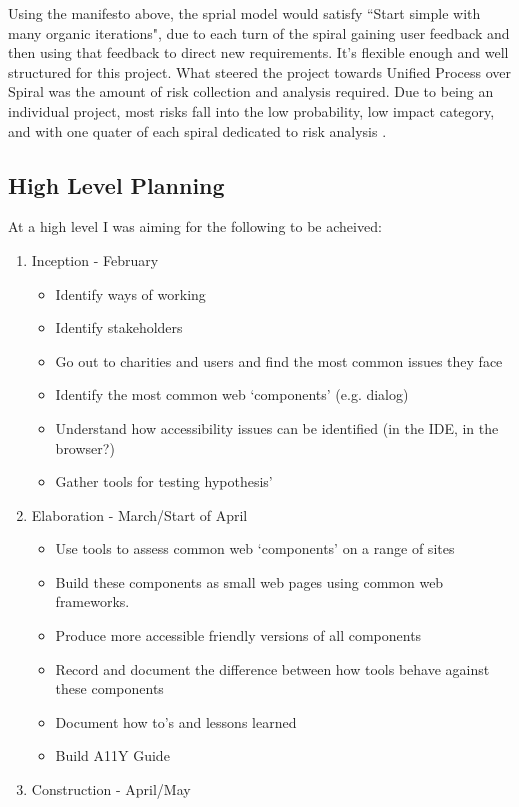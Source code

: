 Using the manifesto above, the sprial model would satisfy ``Start simple with
many organic iterations", due to each turn of the spiral gaining user feedback
and then using that feedback to direct new requirements. It's flexible enough
 and well structured for this project. What steered the project towards Unified
 Process over Spiral was the amount of risk
collection and analysis required. Due to being an individual project, most
risks fall into the low probability, low impact category, and with one quater of
each spiral dedicated to risk analysis .

\subsection{High Level Planning}
At a high level I was aiming for the following to be acheived:
\begin{enumerate}
  \item {Inception - February}
    \begin{itemize}
      \item Identify ways of working
      \item Identify stakeholders
      \item Go out to charities and users and find the most common issues they face
      \item Identify the most common web ‘components’ (e.g. dialog)
      \item Understand how accessibility issues can be identified (in the IDE,
       in the browser?)
      \item Gather tools for testing hypothesis’
    \end{itemize}
  \item {Elaboration - March/Start of April}
    \begin {itemize}
      \item Use tools to assess common web ‘components’ on a range of sites
      \item Build these components as small web pages using common web frameworks.
      \item Produce more accessible friendly versions of all components
      \item Record and document the difference between how tools behave
      against these components
      \item Document how to’s and lessons learned
      \item Build A11Y Guide
    \end {itemize}
  \item {Construction - April/May}

\end{enumerate}

